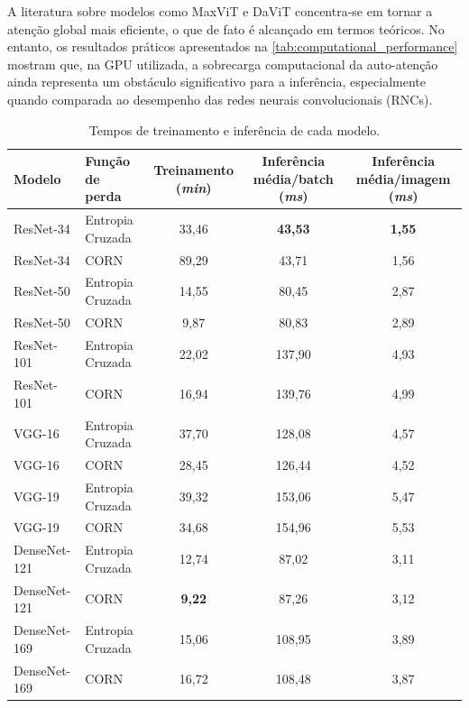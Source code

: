A literatura sobre modelos como MaxViT e DaViT concentra-se em tornar a atenção global mais eficiente, o que de fato é alcançado em termos teóricos. No entanto, os resultados práticos apresentados na \autoref{tab:computational_performance} mostram que, na GPU utilizada, a sobrecarga computacional da auto-atenção ainda representa um obstáculo significativo para a inferência, especialmente quando comparada ao desempenho das redes neurais convolucionais (RNCs).

\begin{table}
    \centering
    \caption{Tempos de treinamento e inferência de cada modelo.}
    \label{tab:computational_performance}
    \begin{tabular}{|l|l|c|c|c|}
        \hline
        \textbf{Modelo} & \textbf{Função de perda} & \textbf{Treinamento (\textit{min})} & \textbf{Inferência média/batch (\textit{ms})} & \textbf{Inferência média/imagem (\textit{ms})} \\
        \hline
        ResNet-34 & Entropia Cruzada & 33,46 & \textbf{43,53} & \textbf{1,55} \\
        \hline
        ResNet-34 & CORN & 89,29 & 43,71 & 1,56 \\
        \hline
        ResNet-50 & Entropia Cruzada & 14,55 & 80,45 & 2,87 \\
        \hline
        ResNet-50 & CORN & 9,87 & 80,83 & 2,89 \\
        \hline
        ResNet-101 & Entropia Cruzada & 22,02 & 137,90 & 4,93 \\
        \hline
        ResNet-101 & CORN & 16,94 & 139,76 & 4,99 \\
        \hline
        VGG-16 & Entropia Cruzada & 37,70 & 128,08 & 4,57 \\
        \hline
        VGG-16 & CORN & 28,45 & 126,44 & 4,52 \\
        \hline
        VGG-19 & Entropia Cruzada & 39,32 & 153,06 & 5,47 \\
        \hline
        VGG-19 & CORN & 34,68 & 154,96 & 5,53 \\
        \hline
        DenseNet-121 & Entropia Cruzada & 12,74 & 87,02 & 3,11 \\
        \hline
        DenseNet-121 & CORN & \textbf{9,22} & 87,26 & 3,12 \\
        \hline
        DenseNet-169 & Entropia Cruzada & 15,06 & 108,95 & 3,89 \\
        \hline
        DenseNet-169 & CORN & 16,72 & 108,48 & 3,87 \\

\end{tabular}
\end{table}
